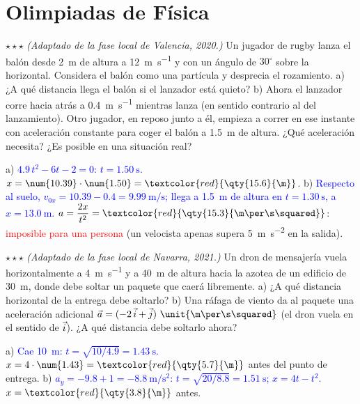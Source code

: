 \section{Olimpiadas de Física}\label{sec:ud9-olimpiadas}

\begin{exercise}
    \(\star\star\star\) \textit{(Adaptado de la fase local de Valencia, 2020.)} Un jugador de rugby lanza el balón desde \qty{2}{\m}
    de altura a \qty{12}{\m\per\s} y con un ángulo de \(30^\circ\) sobre la horizontal. Considera el balón como una partícula y
    desprecia el rozamiento. a) ¿A qué distancia llega el balón si el lanzador está quieto? b) Ahora el lanzador corre hacia atrás a
    \qty{0.4}{\m\per\s} mientras lanza (en sentido contrario al del lanzamiento). Otro jugador, en reposo junto a él, empieza a correr
    en ese instante con aceleración constante para coger el balón a \qty{1.5}{\m} de altura. ¿Qué aceleración necesita? ¿Es posible
    en una situación real?
    \begin{solu}
        a) \textcolor{blue}{\(\num{4.9}\,t^2 - 6t - 2 = 0\): \(t = \qty{1.50}{\s}\).} \(x = \num{10.39} \cdot \num{1.50} =
        \textcolor{red}{\qty{15.6}{\m}}\). b) \textcolor{blue}{Respecto al suelo, \(v_{0x} = \num{10.39} - \num{0.4} = \qty{9.99}{\m\per\s}\);
        llega a \qty{1.5}{\m} de altura en \(t = \qty{1.30}{\s}\), a \(x = \qty{13.0}{\m}\).} \(a = \dfrac{2x}{t^2} =
        \textcolor{red}{\qty{15.3}{\m\per\s\squared}}\): \textcolor{red}{imposible para una persona} (un velocista apenas supera
        \qty{5}{\m\per\s\squared} en la salida).
    \end{solu}
\end{exercise}

\begin{exercise}
    \(\star\star\star\) \textit{(Adaptado de la fase local de Navarra, 2021.)} Un dron de mensajería vuela horizontalmente a
    \qty{4}{\m\per\s} y a \qty{40}{\m} de altura hacia la azotea de un edificio de \qty{30}{\m}, donde debe soltar un paquete que caerá
    libremente. a) ¿A qué distancia horizontal de la entrega debe soltarlo? b) Una ráfaga de viento da al paquete una aceleración
    adicional \(\vec a = (-2\,\ivec + \jvec)~\unit{\m\per\s\squared}\) (el dron vuela en el sentido de \(\vec{i}\)). ¿A qué distancia
    debe soltarlo ahora?
    \begin{solu}
        a) \textcolor{blue}{Cae \qty{10}{\m}: \(t = \sqrt{10/\num{4.9}} = \qty{1.43}{\s}\).} \(x = 4 \cdot \num{1.43} = \textcolor{red}{\qty{5.7}{\m}}\)
        antes del punto de entrega. b) \textcolor{blue}{\(a_y = -\num{9.8} + 1 = \qty{-8.8}{\m\per\s\squared}\): \(t = \sqrt{20/\num{8.8}} =
        \qty{1.51}{\s}\); \(x = 4t - t^2\).} \(x = \textcolor{red}{\qty{3.8}{\m}}\) antes.
    \end{solu}
\end{exercise}

